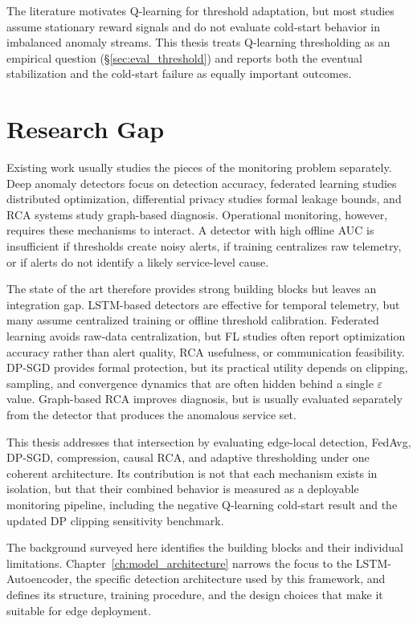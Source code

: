 The literature motivates Q-learning for threshold adaptation, but most
studies assume stationary reward signals and do not evaluate cold-start
behavior in imbalanced anomaly streams. This thesis treats Q-learning
thresholding as an empirical question (\S\ref{sec:eval_threshold}) and
reports both the eventual stabilization and the cold-start failure as
equally important outcomes.

\section{Research Gap}
\label{sec:bg_gap}

Existing work usually studies the pieces of the monitoring problem separately.
Deep anomaly detectors focus on detection accuracy, federated learning studies
distributed optimization, differential privacy studies formal leakage bounds,
and RCA systems study graph-based diagnosis. Operational monitoring, however,
requires these mechanisms to interact. A detector with high offline AUC is
insufficient if thresholds create noisy alerts, if training centralizes raw
telemetry, or if alerts do not identify a likely service-level cause.

The state of the art therefore provides strong building blocks but leaves an
integration gap. LSTM-based detectors are effective for temporal telemetry, but
many assume centralized training or offline threshold calibration. Federated
learning avoids raw-data centralization, but FL studies often report
optimization accuracy rather than alert quality, RCA usefulness, or
communication feasibility. DP-SGD provides formal protection, but its practical
utility depends on clipping, sampling, and convergence dynamics that are often
hidden behind a single $\varepsilon$ value. Graph-based RCA improves diagnosis,
but is usually evaluated separately from the detector that produces the
anomalous service set.

This thesis addresses that intersection by evaluating edge-local detection,
FedAvg, DP-SGD, compression, causal RCA, and adaptive thresholding under one
coherent architecture. Its contribution is not that each mechanism exists in
isolation, but that their combined behavior is measured as a deployable
monitoring pipeline, including the negative Q-learning cold-start result and
the updated DP clipping sensitivity benchmark.

The background surveyed here identifies the building blocks and their
individual limitations. Chapter~\ref{ch:model_architecture} narrows the focus
to the LSTM-Autoencoder, the specific detection architecture used by this
framework, and defines its structure, training procedure, and the design
choices that make it suitable for edge deployment.
